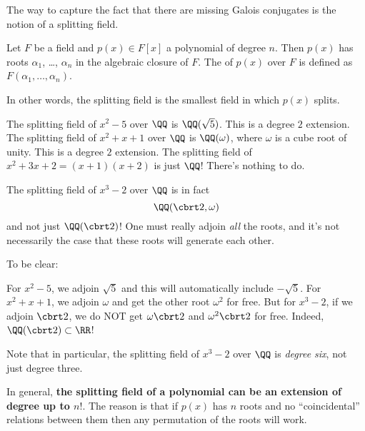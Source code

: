 The way to capture the fact that there are missing Galois conjugates
is the notion of a splitting field.
\begin{definition}
	Let $F$ be a field and $p(x) \in F[x]$ a polynomial of degree $n$.
	Then $p(x)$ has roots $\alpha_1$, \dots, $\alpha_n$ in the algebraic closure of $F$.
	The  of $p(x)$ over $F$ is defined as $F(\alpha_1, \dots, \alpha_n)$.
\end{definition}
In other words, the splitting field is the smallest field in which $p(x)$ splits.
\begin{example}
	\listhack
	\begin{enumerate}[(a)]
		\ii The splitting field of $x^2 - 5$ over $\QQ$ is $\QQ(\sqrt 5)$.
		This is a degree $2$ extension.
		\ii The splitting field of $x^2+x+1$ over $\QQ$ is $\QQ(\omega)$,
		where $\omega$ is a cube root of unity.
		This is a degree $2$ extension.
		\ii The splitting field of $x^2+3x+2 = (x+1)(x+2)$ is just $\QQ$!
		There's nothing to do.
	\end{enumerate}
\end{example}
\begin{example}
	The splitting field of $x^3 - 2$ over $\QQ$ is in fact
	\[ \QQ( \cbrt 2, \omega ) \]
	and not just $\QQ(\cbrt 2)$!
	One must really adjoin \emph{all} the roots, and it's not necessarily the case that
	these roots will generate each other.

	To be clear:
	\begin{itemize}
	\ii For $x^2-5$, we adjoin $\sqrt 5$ and this will automatically include $-\sqrt 5$.
	\ii For $x^2+x+1$, we adjoin $\omega$ and get the other root $\omega^2$ for free.
	\ii But for $x^3-2$, if we adjoin $\cbrt 2$,
	we do NOT get $\omega\cbrt2$ and $\omega^2\cbrt2$ for free.
	Indeed, $\QQ(\cbrt 2) \subset \RR$!
	\end{itemize}
	Note that in particular, the splitting field of
	$x^3-2$ over $\QQ$ is \emph{degree six}, not just degree three.
\end{example}

In general,
\textbf{the splitting field of a polynomial can be an extension of degree up to $n!$}.
The reason is that if $p(x)$ has $n$ roots and no
``coincidental'' relations between them
then any permutation of the roots will work.

